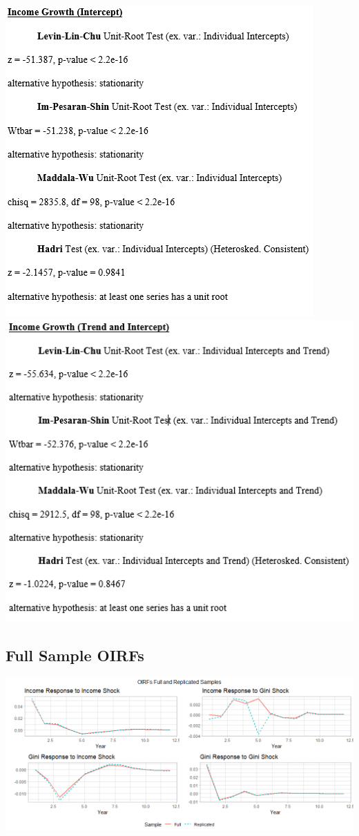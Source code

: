 \documentclass[11pt,preprint, authoryear]{elsarticle}
\let\origfigure\figure
\let\endorigfigure\endfigure
\renewenvironment{figure}[1][2] {
    \expandafter\origfigure\expandafter[H]
} {
    \endorigfigure
}
\numberwithin{equation}{section}
\numberwithin{figure}{section}
\numberwithin{table}{section}
\begin{document}
\begin{center}\includegraphics[width=0.49\linewidth,height=0.35\textheight]{images/Income_Growth_Intercept} \includegraphics[width=0.49\linewidth,height=0.35\textheight]{images/Income_Growth_Trend} \end{center}

\hypertarget{full-sample-oirfs}{%
\subsection{\texorpdfstring{Full Sample OIRFs
\label{B}}{Full Sample OIRFs }}\label{full-sample-oirfs}}

\begin{figure}[H]
\includegraphics[width=1\linewidth]{images/Appendix_B_OIRFs_both_samples} \caption{\label{Fig6}}\label{fig:AppB}
\end{figure}


\end{document}
